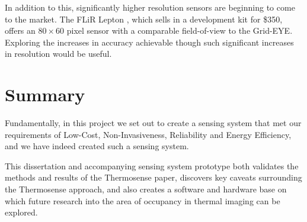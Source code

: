 \documentclass[../thesis/thesis.tex]{subfiles}
\begin{document}
In addition to this, significantly higher resolution sensors are beginning to come to the market. The FLiR Lepton \cite{flir}, which sells in a development kit for \$350, offers an $80 \times 60$ pixel sensor with a comparable field-of-view to the Grid-EYE. Exploring the increases in accuracy achievable though such significant increases in resolution would be useful.

\section{Summary}
Fundamentally, in this project we set out to create a sensing system that met our requirements of Low-Cost, Non-Invasiveness, Reliability and Energy Efficiency, and we have indeed created such a sensing system. %

This dissertation and accompanying sensing system prototype both validates the methods and results of the Thermosense paper, discovers key caveats surrounding the Thermosense approach, and also creates a software and hardware base on which future research into the area of occupancy in thermal imaging can be explored.
 
\end{document}
